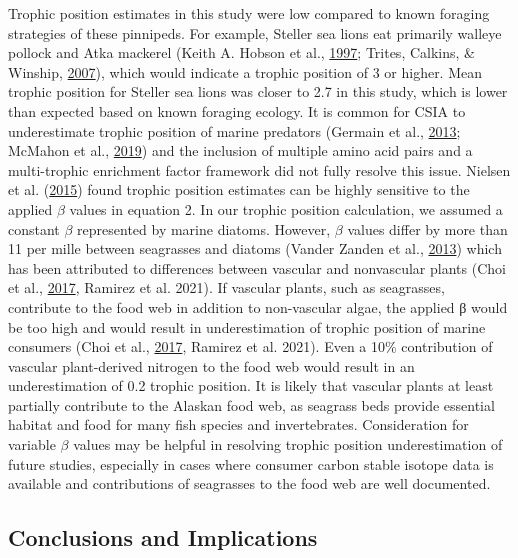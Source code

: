 \documentclass [11pt, proquest] {uwthesis}[2015/03/03]
\begin{document}
Trophic position estimates in this study were low compared to known
foraging strategies of these pinnipeds. For example, Steller sea lions
eat primarily walleye pollock and Atka mackerel (Keith A. Hobson et al.,
\protect\hyperlink{ref-Hobson1997}{1997}; Trites, Calkins, \& Winship,
\protect\hyperlink{ref-Trites2007}{2007}), which would indicate a
trophic position of 3 or higher. Mean trophic position for Steller sea
lions was closer to 2.7 in this study, which is lower than expected
based on known foraging ecology. It is common for CSIA to underestimate
trophic position of marine predators (Germain et al.,
\protect\hyperlink{ref-Germain2013}{2013}; McMahon et al.,
\protect\hyperlink{ref-McMahon2019}{2019}) and the inclusion of multiple
amino acid pairs and a multi-trophic enrichment factor framework did not
fully resolve this issue. Nielsen et al.
(\protect\hyperlink{ref-Nielsen2015}{2015}) found trophic position
estimates can be highly sensitive to the applied \(\beta\) values in
equation 2. In our trophic position calculation, we assumed a constant
\(\beta\) represented by marine diatoms. However, \(\beta\) values
differ by more than 11 per mille between seagrasses and diatoms (Vander
Zanden et al., \protect\hyperlink{ref-VanderZanden2013}{2013}) which has
been attributed to differences between vascular and nonvascular plants
(Choi et al., \protect\hyperlink{ref-Choi2017}{2017}, Ramirez et al.
2021). If vascular plants, such as seagrasses, contribute to the food
web in addition to non-vascular algae, the applied β would be too high
and would result in underestimation of trophic position of marine
consumers (Choi et al., \protect\hyperlink{ref-Choi2017}{2017}, Ramirez
et al. 2021). Even a 10\% contribution of vascular plant-derived
nitrogen to the food web would result in an underestimation of 0.2
trophic position. It is likely that vascular plants at least partially
contribute to the Alaskan food web, as seagrass beds provide essential
habitat and food for many fish species and invertebrates. Consideration
for variable \(\beta\) values may be helpful in resolving trophic
position underestimation of future studies, especially in cases where
consumer carbon stable isotope data is available and contributions of
seagrasses to the food web are well documented.

\subsection{Conclusions and
Implications}\label{conclusions-and-implications}
\end{document}
